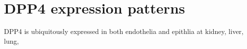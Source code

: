 \section{DPP4 expression patterns}
DPP4 is ubiquitously expressed in both endothelia and epithlia at  kidney, liver, lung, 